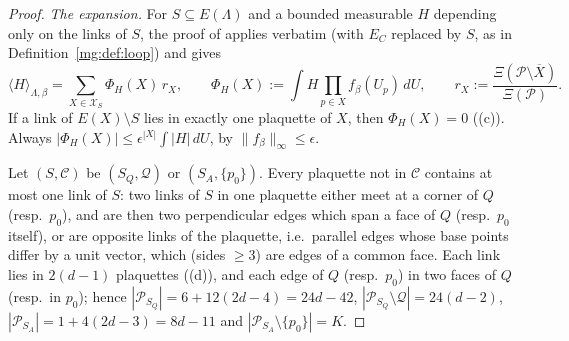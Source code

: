 \documentclass[11pt,a4paper]{article}
\theoremstyle{definition}
\theoremstyle{remark}
\newcommand{\cP}{\mathcal{P}}
\newcommand{\cX}{\mathcal{X}}
\newcommand{\dU}{\,dU}
\newcommand{\norm}[1]{\lVert #1\rVert}
\newcommand{\IIIref}[3]{\cite[#1~`#2' (\texttt{#3})]{III}}
\newcommand{\IIIlab}[2]{\cite[#1 \texttt{#2}]{III}}
\begin{document}
\begin{proof}
\emph{The expansion.} For $S\subseteq E(\Lambda)$ and a bounded measurable $H$ depending only on the links of $S$, the proof of
\IIIref{Lemma}{Loop expansion}{al:lem:loopexp} applies verbatim (with $E_C$ replaced by $S$, as in Definition~\ref{mg:def:loop}) and gives
\[
\langle H\rangle_{\Lambda,\beta}=\sum_{X\in\cX_S}\Phi_H(X)\,r_X,\qquad\Phi_H(X):=\int H\prod_{p\in X}f_\beta(U_p)\dU,\qquad r_X:=\frac{\Xi(\cP\setminus\overline X)}{\Xi(\cP)} .
\]
If a link of $E(X)\setminus S$ lies in exactly one plaquette of $X$, then $\Phi_H(X)=0$ (\IIIlab{Lemma}{al:lem:facts}(c)). Always
$|\Phi_H(X)|\le\epsilon^{|X|}\int|H|\dU$, by $\norm{f_\beta}_\infty\le\epsilon$.

Let $(S,\mathcal C)$ be $(S_Q,\mathcal Q)$ or $(S_A,\{p_0\})$. Every plaquette not in $\mathcal C$ contains at most one link of $S$: two links of
$S$ in one plaquette either meet at a corner of $Q$ (resp.\ $p_0$), and are then two perpendicular edges which span a face of $Q$ (resp.\ $p_0$
itself), or are opposite links of the plaquette, i.e.\ parallel edges whose base points differ by a unit vector, which (sides $\ge3$) are edges
of a common face. Each link lies in $2(d-1)$ plaquettes (\IIIlab{Lemma}{al:lem:facts}(d)), and each edge of $Q$ (resp.\ $p_0$) in two faces of
$Q$ (resp.\ in $p_0$); hence $|\cP_{S_Q}|=6+12(2d-4)=24d-42$, $|\cP_{S_Q}\setminus\mathcal Q|=24(d-2)$, $|\cP_{S_A}|=1+4(2d-3)=8d-11$ and
$|\cP_{S_A}\setminus\{p_0\}|=K$.


\end{proof}
\end{document}
